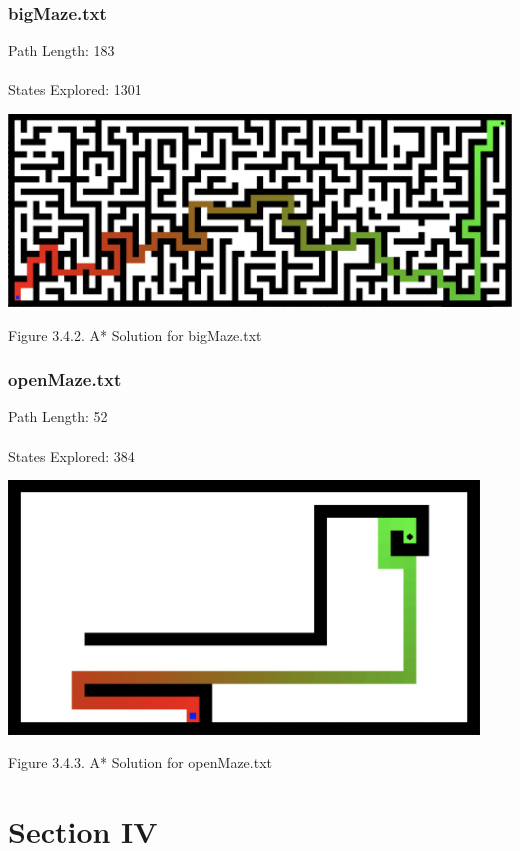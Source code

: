 \documentclass{mcmthesis}
\begin{document}
\subsubsection{bigMaze.txt}
Path Length: 183 \\ \\
States Explored: 1301
\begin{center}
\includegraphics[width=15cm]{A_bigmaze.png}
\end{center}
\begin{center}
\small{Figure 3.4.2. A* Solution for bigMaze.txt}
\end{center}

\subsubsection{openMaze.txt}
Path Length: 52 \\ \\
States Explored: 384
\begin{center}
\includegraphics[width=12.5cm]{greedy_openmaze.png}
\end{center}
\begin{center}
\small{Figure 3.4.3. A* Solution for openMaze.txt}
\end{center}

\section{Section IV}
\end{document}

